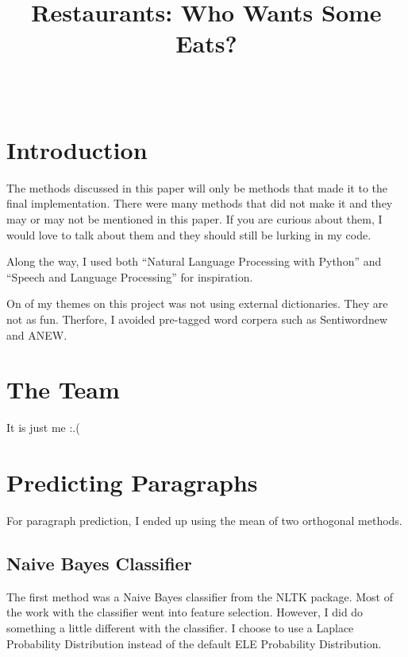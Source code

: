 \documentclass[]{IEEEtran}
\begin{document}
\title{Restaurants: Who Wants Some Eats?}


\author{
\\
}

\maketitle

\thispagestyle{empty}
\pagestyle{empty}

\section{Introduction}
The methods discussed in this paper will only be methods that made it to the final implementation.
There were many methods that did not make it and they may or may not be mentioned in this paper.
If you are curious about them, I would love to talk about them and they should still be lurking in
my code.

Along the way, I used both ``Natural Language Processing with Python''\cite{pythonNlltk} and
``Speech and Language Processing''\cite{jurafsky} for inspiration.

On of my themes on this project was not using external dictionaries. They are not as fun. Therfore,
I avoided pre-tagged word corpera such as Sentiwordnew\cite{sentiwordnet} and ANEW\cite{anew}.

\section{The Team}
It is just me :.(\cite{spoons}

\section{Predicting Paragraphs}
For paragraph prediction, I ended up using the mean of two orthogonal methods.

\subsection{Naive Bayes Classifier}
The first method was a Naive Bayes classifier from the NLTK package\cite{nltk}. Most of the work with the classifier went into feature selection.
However, I did do something a little different with the classifier. I choose to use a Laplace Probability Distribution
instead of the default ELE Probability Distribution.
\end{document}

